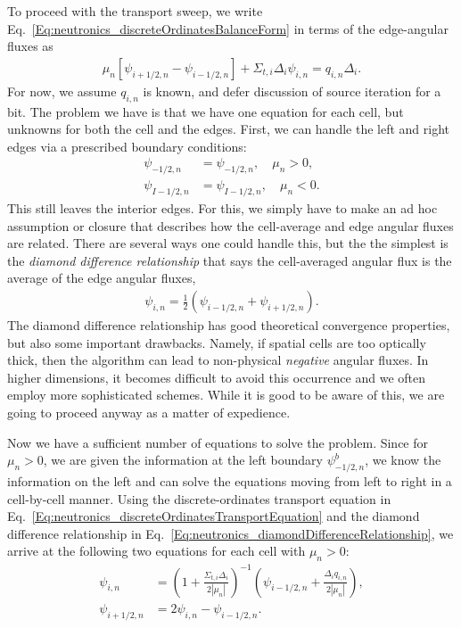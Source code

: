 To proceed with the transport sweep, we write Eq.~\eqref{Eq:neutronics_discreteOrdinatesBalanceForm} in terms of the edge-angular fluxes as
\begin{align}
  \mu_n \left[ \psi_{i+1/2,n} - \psi_{i-1/2,n} \right] + \Sigma_{t,i} \Delta_i \psi_{i,n} = q_{i,n} \Delta_i . \label{Eq:neutronics_discreteOrdinatesTransportEquation}
\end{align}
For now, we assume $q_{i,n}$ is known, and defer discussion of source iteration for a bit. The problem we have is that we have one equation for each cell, but unknowns for both the cell and the edges. First, we can handle the left and right edges via a prescribed boundary conditions:
\begin{subequations}
\begin{align}
  \psi_{-1/2,n}  &= \psi_{-1/2,n},  \quad \mu_n > 0, \\
  \psi_{I-1/2,n} &= \psi_{I-1/2,n}, \quad \mu_n < 0.  
\end{align}
\end{subequations}
This still leaves the interior edges. For this, we simply have to make an ad hoc assumption or closure that describes how the cell-average and edge angular fluxes are related. There are several ways one could handle this, but the the simplest is the \emph{diamond difference relationship} that says the cell-averaged angular flux is the average of the edge angular fluxes,
\begin{align}
  \psi_{i,n} = \frac{1}{2} \left( \psi_{i-1/2,n} + \psi_{i+1/2,n} \right) . \label{Eq:neutronics_diamondDifferenceRelationship}
\end{align}
The diamond difference relationship has good theoretical convergence properties, but also some important drawbacks. Namely, if spatial cells are too optically thick, then the algorithm can lead to non-physical \emph{negative} angular fluxes. In higher dimensions, it becomes difficult to avoid this occurrence and we often employ more sophisticated schemes. While it is good to be aware of this, we are going to proceed anyway as a matter of expedience.

Now we have a sufficient number of equations to solve the problem. Since for $\mu_n > 0$, we are given the information at the left boundary $\psi_{-1/2,n}^b$, we know the information on the left and can solve the equations moving from left to right in a cell-by-cell manner. Using the discrete-ordinates transport equation in Eq.~\eqref{Eq:neutronics_discreteOrdinatesTransportEquation} and the diamond difference relationship in Eq.~\eqref{Eq:neutronics_diamondDifferenceRelationship}, we arrive at the following two equations for each cell with $\mu_n > 0$:
\begin{subequations}
\begin{align}
  \psi_{i,n} &= \left( 1 + \frac{\Sigma_{t,i} \Delta_i}{ 2 | \mu_n | } \right)^{-1} \left( \psi_{i-1/2,n} + \frac{ \Delta_i q_{i,n} }{ 2 | \mu_n | } \right) , \\
  \psi_{i+1/2,n} &= 2 \psi_{i,n} - \psi_{i-1/2,n} .
\end{align}
\end{subequations}

